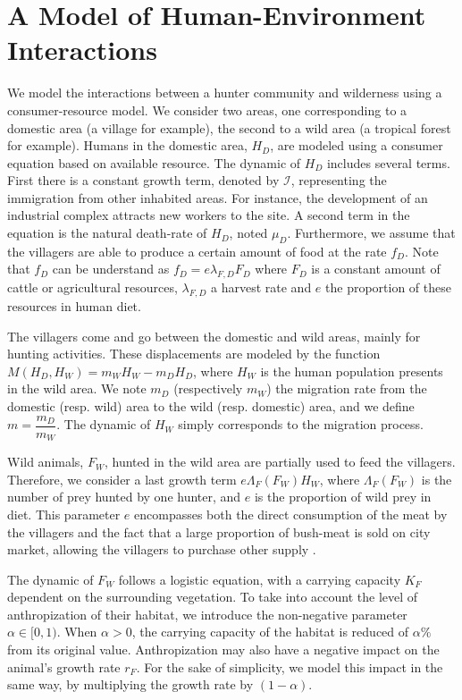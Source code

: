 \documentclass{article}
\newcommand{\lfd}{\lambda_{F, D}}
\newcommand{\cI}{\mathcal{I}}
\theoremstyle{definition}
\theoremstyle{remark}
\begin{document}
\section{A Model of Human-Environment Interactions} \label{sec:model}
We model the interactions between a hunter community and wilderness using a consumer-resource model. We consider two areas, one corresponding to a domestic area (a village for example), the second to a wild area (a tropical forest for example). Humans in the domestic area, $H_D$, are modeled using a consumer equation based on available resource. The dynamic of $H_D$ includes several terms. First there is a constant growth term, denoted by $\cI$, representing the immigration from other inhabited areas. For instance, the development of an industrial complex attracts new workers to the site. A second term in the equation is the natural death-rate of $H_D$, noted $\mu_D$. Furthermore, we assume that the villagers are able to produce a certain amount of food at the rate $f_D$. Note that $f_D$ can be understand as $f_D = e \lfd F_D$ where $F_D$ is a constant amount of cattle or agricultural resources, $\lfd$ a harvest rate and $e$ the proportion of these resources in human diet. 

The villagers come and go between the domestic and wild areas, mainly for hunting activities. These displacements are modeled by the function $M(H_D, H_W) = m_W H_W - m_D H_D$, where $H_W$ is the human population presents in the wild area. We note $m_D$ (respectively $m_W$) the migration rate from the domestic (resp. wild) area to the wild (resp. domestic) area, and we define $m = \dfrac{m_D}{m_W}$. The dynamic of $H_W$ simply corresponds to the migration process. 

Wild animals, $F_W$, hunted in the wild area are partially used to feed the villagers. Therefore, we consider a last growth term $e \Lambda_F(F_W) H_W$, where $\Lambda_F(F_W)$ is the number of prey hunted by one hunter, and $e$ is the proportion of wild prey in diet. This parameter $e$ encompasses both the direct consumption of the meat by the villagers and the fact that a large proportion of bush-meat is sold on city market, allowing the villagers to purchase other supply \cite{wilkie_bushmeat_1998}.


The dynamic of $F_W$ follows a logistic equation, with a carrying capacity $K_F$ dependent on the surrounding vegetation. To take into account the level of anthropization of their habitat, we introduce the non-negative parameter $\alpha \in [0, 1)$. When $\alpha > 0$, the carrying capacity of the habitat is reduced of $\alpha \%$ from its original value. Anthropization may also have a negative impact on the animal's growth rate $r_F$. For the sake of simplicity, we model this impact in the same way, by multiplying the growth rate by $(1-\alpha)$.
\end{document}
